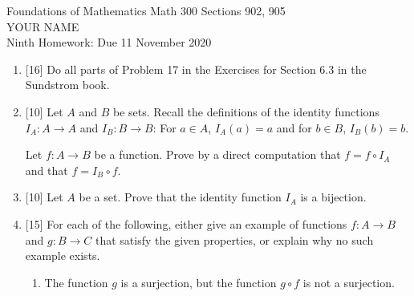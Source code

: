 \documentclass[12pt]{article}
\begin{document}
\LARGE 
\noindent
{\color{Maroon}Foundations of Mathematics \hfill Math 300 Sections 902, 905}\vspace{2pt}\\
\Large YOUR NAME\vspace{2pt}\\
\large
Ninth Homework: \hfill Due {\color{red}11} November 2020
\normalsize    %

\noindent{\color{blue}\rule{529pt}{2pt}}

  
\begin{enumerate}


\item{[16]} Do all parts of Problem 17 in the Exercises for Section 6.3 in the Sundstrom book.



  \item{[10]}  Let $A$ and $B$ be sets.
    Recall the definitions of the identity functions $I_A\colon A\to A$ and  $I_B\colon B\to B$:
    For $a\in A$, $I_A(a)=a$ and for $b\in B$, $I_B(b)=b$.

    Let $f\colon A\to B$ be a function.
    Prove by a direct computation that $f=f\circ I_A$ and that $f=I_B\circ f$.

  \item{[10]}  Let $A$ be a set.  Prove that the identity function $I_A$ is a bijection.

\item{[15]} For each of the following, either give an example of functions $f\colon A\to B$ and $g\colon B\to C$ that satisfy the given
  properties, or explain why no such example exists.

 \begin{enumerate}
  \item The function $g$ is a surjection, but the function $g\circ f$ is not a surjection.


\end{enumerate}
\end{enumerate}
\end{document}
